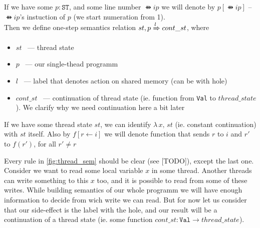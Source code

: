 If we have some $p : \texttt{ST}$, and some line number $\ffun{ip}$ we will denote by $p[\ffun{ip}]$ -- $\ffun{ip}$'s instuction of $p$ (we start numeration from 1).  \\
Then we define one-step semantics relation $st, p \xRightarrow{l} cont\_st$, where
\begin{itemize}
  \item $st$ ~--- thread state
  \item $p$ ~--- our single-thead programm
  \item $l$ ~--- label that denotes action on shared memory (can be with hole)
  \item $cont\_st$ ~--- continuation of thread state (ie. function from \texttt{Val} to $thread\_state$). We clarify why we need continuation here a bit later
\end{itemize}
If we have some thread state $st$, we can identify $\lambda\, x,\, st$ (ie. constant continuation) with $st$ itself. Also by $f[r \leftarrow i]$ we will denote function that sends $r$ to $i$ and $r'$ to $f(r')$, for all $r' \neq r$



Every rule in \cref{fig:thread_sem} should be clear (see [TODO]), except the last one. Consider we want to read some local variable $x$ in some thread. Another threads can write something to this $x$ too, and it is possible to read from some of these writes. While building semantics of our whole programm we will have enough information to decide from wich write we can read. But for now let us consider that our side-effect is the label with the hole, and our result will be a continuation of a thread state (ie. some function $cont\_st : \texttt{Val} \to thread\_state$). 



